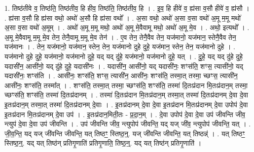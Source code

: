 \documentclass[17pt]{extarticle}
\begin{document}
1. तिष्ठ॑तीवे व॒ तिष्ठ॑ति॒ तिष्ठ॑तीव॒ हि हीव॒ तिष्ठ॑ति॒ तिष्ठ॑तीव॒ हि । . इ॒व॒ हि हीवे॑ व॒ ह्य॑सा व॒सौ हीवे॑ व॒ ह्य॑सौ । . ह्य॑सा व॒सौ हि ह्य॑सा वथो॒ अथो॑ अ॒सौ हि ह्य॑सा वथो᳚ । . अ॒सा वथो॒ अथो॑ अ॒सा व॒सा वथो॑ अ॒मू म॒मू मथो॑ अ॒सा व॒सा वथो॑ अ॒मूम् । . अथो॑ अ॒मू म॒मू मथो॒ अथो॑ अ॒मू मे॒वैवामू मथो॒ अथो॑ अ॒मू मे॒व । . अथो॒ इत्यथो᳚ । . अ॒मू मे॒वैवामू म॒मू मे॒व तेन॒ तेनै॒वामू म॒मू मे॒व तेन॑ । . ए॒व तेन॒ तेनै॒वैव तेन॒ यज॑मानो॒ यज॑मान॒ स्तेनै॒वैव तेन॒ यज॑मानः । . तेन॒ यज॑मानो॒ यज॑मान॒ स्तेन॒ तेन॒ यज॑मानो दुहे दुहे॒ यज॑मान॒ स्तेन॒ तेन॒ यज॑मानो दुहे । . यज॑मानो दुहे दुहे॒ यज॑मानो॒ यज॑मानो दुहे॒ यद् यद् दु॑हे॒ यज॑मानो॒ यज॑मानो दुहे॒ यत् । . दु॒हे॒ यद् यद् दु॑हे दुहे॒ यदासी॑न॒ आसी॑नो॒ यद् दु॑हे दुहे॒ यदासी॑नः । . यदासी॑न॒ आसी॑नो॒ यद् यदासी॑नः॒ शꣳस॑ति॒ शꣳस॒ त्यासी॑नो॒ यद् यदासी॑नः॒ शꣳस॑ति । . आसी॑नः॒ शꣳस॑ति॒ शꣳस॒ त्यासी॑न॒ आसी॑नः॒ शꣳस॑ति॒ तस्मा॒त् तस्मा॒ च्छꣳस॒ त्यासी॑न॒ आसी॑नः॒ शꣳस॑ति॒ तस्मा᳚त् । . शꣳस॑ति॒ तस्मा॒त् तस्मा॒ च्छꣳस॑ति॒ शꣳस॑ति॒ तस्मा॑ दि॒तःप्र॑दान मि॒तःप्र॑दान॒म् तस्मा॒ च्छꣳस॑ति॒ शꣳस॑ति॒ तस्मा॑ दि॒तःप्र॑दानम् । . तस्मा॑ दि॒तःप्र॑दान मि॒तःप्र॑दान॒म् तस्मा॒त् तस्मा॑ दि॒तःप्र॑दानम् दे॒वा दे॒वा इ॒तःप्र॑दान॒म् तस्मा॒त् तस्मा॑ दि॒तःप्र॑दानम् दे॒वाः । . इ॒तःप्र॑दानम् दे॒वा दे॒वा इ॒तःप्र॑दान मि॒तःप्र॑दानम् दे॒वा उपोप॑ दे॒वा इ॒तःप्र॑दान मि॒तःप्र॑दानम् दे॒वा उप॑ । . इ॒तःप्र॑दान॒मिती॒तः - प्र॒दा॒न॒म् । . दे॒वा उपोप॑ दे॒वा दे॒वा उप॑ जीवन्ति जीव॒ न्त्युप॑ दे॒वा दे॒वा उप॑ जीवन्ति । . उप॑ जीवन्ति जीव॒ न्त्युपोप॑ जीवन्ति॒ यद् यज् जी॑व॒ न्त्युपोप॑ जीवन्ति॒ यत् । . जी॒व॒न्ति॒ यद् यज् जी॑वन्ति जीवन्ति॒ यत् तिष्ठꣳ॒॒ स्तिष्ठ॒न्॒. यज् जी॑वन्ति जीवन्ति॒ यत् तिष्ठन्न्॑ । . यत् तिष्ठꣳ॒॒ स्तिष्ठ॒न्॒. यद् यत् तिष्ठ॑न् प्रतिगृ॒णाति॑ प्रतिगृ॒णाति॒ तिष्ठ॒न्॒. यद् यत् तिष्ठ॑न् प्रतिगृ॒णाति॑ । \newline
\end{document}
